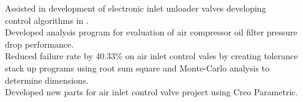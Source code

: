 \runsubsection{\textcolor{bobcat}{Bobcat}}
\begin{minipage}{1\textwidth\vspace{2pt}}
\textcolor{bobcat}{\mybar}\faAngleRight Assisted in development of  electronic inlet unloader valves developing\\
\textcolor{bobcat}{\mybar}\textcolor{invisible}{\faAngleRight}control algorithms in . \\ 
\textcolor{bobcat}{\mybar}\faAngleRight Developed analysis program for evaluation of air compressor oil  filter pressure \\
\textcolor{bobcat}{\mybar}\textcolor{invisible}{\faAngleRight}drop performance.\\
\textcolor{bobcat}{\mybar}\faAngleRight Reduced failure rate by 40.33\% on air inlet control vales by creating tolerance\\
\textcolor{bobcat}{\mybar}\textcolor{invisible}{\faAngleRight}stack up programs using root sum square and Monte-Carlo analysis to\\ 
\textcolor{bobcat}{\mybar}\textcolor{invisible}{\faAngleRight}determine dimensions.\\
\textcolor{bobcat}{\mybar}\faAngleRight Developed new parts for air inlet control valve project using Creo Parametric.
\end{minipage}

